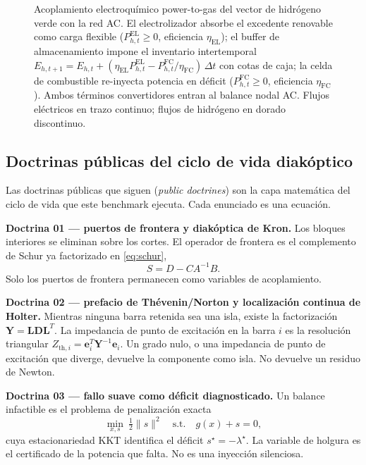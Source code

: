 \begin{figure}[!t]
\centering
\resizebox{0.85\textwidth}{!}{}
\caption{Acoplamiento electroquímico power-to-gas del vector de hidrógeno verde con la red AC. El electrolizador absorbe el excedente renovable como carga flexible ($P^{\mathrm{EL}}_{h,t} \ge 0$, eficiencia $\eta_{\mathrm{EL}}$); el buffer de almacenamiento impone el inventario intertemporal $E_{h,t+1} = E_{h,t} + (\eta_{\mathrm{EL}} P^{\mathrm{EL}}_{h,t} - P^{\mathrm{FC}}_{h,t}/\eta_{\mathrm{FC}})\,\Delta t$ con cotas de caja; la celda de combustible re-inyecta potencia en déficit ($P^{\mathrm{FC}}_{h,t} \ge 0$, eficiencia $\eta_{\mathrm{FC}}$). Ambos términos convertidores entran al balance nodal AC. Flujos eléctricos en trazo continuo; flujos de hidrógeno en dorado discontinuo.}
\label{fig:p2g_h2}
\end{figure}


\subsection{Doctrinas públicas del ciclo de vida diakóptico}
\label{sub:doctrines}

Las doctrinas públicas que siguen (\emph{public doctrines}) son la capa matemática del ciclo de vida que este benchmark ejecuta. Cada enunciado es una ecuación.

\textbf{Doctrina 01 --- puertos de frontera y diakóptica de Kron.} Los bloques interiores se eliminan sobre los cortes. El operador de frontera es el complemento de Schur ya factorizado en \eqref{eq:schur},
\begin{equation*}
S = D - C A^{-1} B.
\end{equation*}
Solo los puertos de frontera permanecen como variables de acoplamiento.

\textbf{Doctrina 02 --- prefacio de Th\'evenin/Norton y localización continua de Holter.} Mientras ninguna barra retenida sea una isla, existe la factorización $\mathbf{Y}=\mathbf{L}\mathbf{D}\mathbf{L}^{T}$. La impedancia de punto de excitación en la barra $i$ es la resolución triangular $Z_{\mathrm{th},i}=\mathbf{e}_i^{T}\mathbf{Y}^{-1}\mathbf{e}_i$. Un grado nulo, o una impedancia de punto de excitación que diverge, devuelve la componente como isla. No devuelve un residuo de Newton.

\textbf{Doctrina 03 --- fallo suave como déficit diagnosticado.} Un balance infactible es el problema de penalización exacta
\begin{equation}
\min_{x,s}\ \tfrac12\lVert s\rVert^{2}\quad\mathrm{s.t.}\quad g(x)+s=0,
\label{eq:softfail}
\end{equation}
cuya estacionariedad KKT identifica el déficit $s^{\star}=-\lambda^{\star}$. La variable de holgura es el certificado de la potencia que falta. No es una inyección silenciosa.


